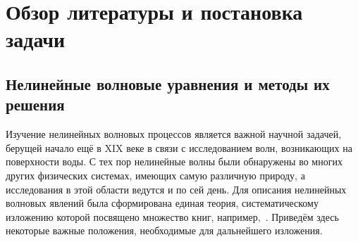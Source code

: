 \documentclass[12pt, a4paper]{report}
\begin{document}
\chapter{Обзор литературы и постановка задачи}

\section{Нелинейные волновые уравнения и методы их решения}
Изучение нелинейных волновых процессов является важной научной задачей, берущей начало ещё в XIX веке в связи с исследованием волн, возникающих на поверхности воды. С тех пор нелинейные волны были обнаружены во многих других физических системах, имеющих самую различную природу, а исследования в этой области ведутся и по сей день. Для описания нелинейных волновых явлений была сформирована единая теория, систематическому изложению которой посвящено множество книг, например,~\cite{Dodd,Ablowitz2011}. Приведём здесь некоторые важные положения, необходимые для дальнейшего изложения.
\end{document}
